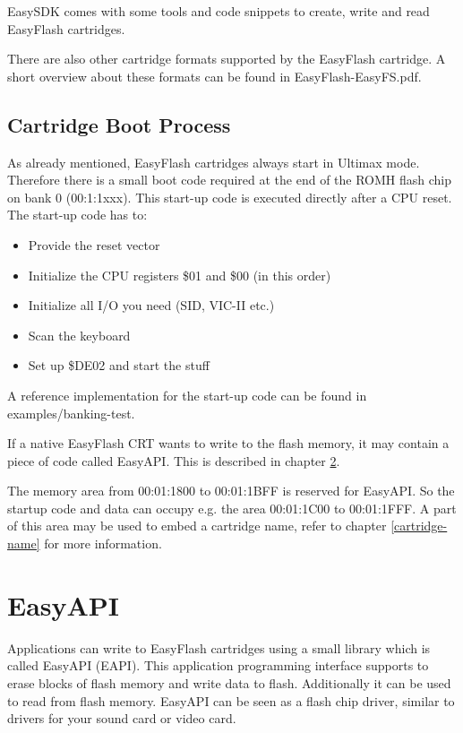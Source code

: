 \documentclass[a4paper,oneside]{memoir}
\begin{document}
EasySDK comes with some tools and code snippets to create, write and read
EasyFlash cartridges.

There are also other cartridge formats supported by the EasyFlash cartridge.
A short overview about these formats can be found in EasyFlash-EasyFS.pdf.

\section{Cartridge Boot Process}

As already mentioned, EasyFlash cartridges always start in Ultimax mode.
Therefore there is a small boot code required at the end of the ROMH flash chip
on bank 0 (00:1:1xxx). This start-up code is executed directly after a CPU reset.
The start-up code has to:

\begin{itemize}
  \item Provide the reset vector
  \item Initialize the CPU registers \$01 and \$00 (in this order)
  \item Initialize all I/O you need (SID, VIC-II etc.)
  \item Scan the keyboard
  \item Set up \$DE02 and start the stuff
\end{itemize}

A reference implementation for the start-up code can be found in
examples/banking-test.

If a native EasyFlash CRT wants to write to the flash memory, it may contain a
piece of code called EasyAPI. This is described in chapter \ref{easyapi}.

The memory area from 00:01:1800 to 00:01:1BFF is reserved for EasyAPI. So the
startup code and data can occupy e.g. the area 00:01:1C00 to 00:01:1FFF. A part
of this area may be used to embed a cartridge name, refer to chapter
\ref{cartridge-name} for more information.


\chapter{EasyAPI}\label{easyapi}

Applications can write to EasyFlash cartridges using a small library which
is called EasyAPI (EAPI). This application programming interface supports to
erase blocks of flash memory and write data to flash. Additionally it can be
used to read from flash memory. EasyAPI can be seen as a flash chip driver,
similar to drivers for your sound card or video card.
\end{document}
